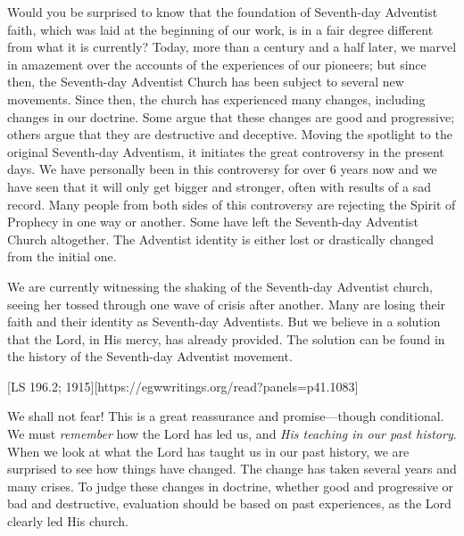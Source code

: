 Would you be surprised to know that the foundation of Seventh-day Adventist faith, which was laid at the beginning of our work, is in a fair degree different from what it is currently? Today, more than a century and a half later, we marvel in amazement over the accounts of the experiences of our pioneers; but since then, the Seventh-day Adventist Church has been subject to several new movements. Since then, the church has experienced many changes, including changes in our doctrine. Some argue that these changes are good and progressive; others argue that they are destructive and deceptive. Moving the spotlight to the original Seventh-day Adventism, it initiates the great controversy in the present days. We have personally been in this controversy for over 6 years now and we have seen that it will only get bigger and stronger, often with results of a sad record. Many people from both sides of this controversy are rejecting the Spirit of Prophecy in one way or another. Some have left the Seventh-day Adventist Church altogether. The Adventist identity is either lost or drastically changed from the initial one.

We are currently witnessing the shaking of the Seventh-day Adventist church, seeing her tossed through one wave of crisis after another. Many are losing their faith and their identity as Seventh-day Adventists. But we believe in a solution that the Lord, in His mercy, has already provided. The solution can be found in the history of the Seventh-day Adventist movement.

[LS 196.2; 1915][https://egwwritings.org/read?panels=p41.1083]

We shall not fear! This is a great reassurance and promise—though conditional. We must \textit{remember} how the Lord has led us, and \textit{His teaching in our past history}. When we look at what the Lord has taught us in our past history, we are surprised to see how things have changed. The change has taken several years and many crises. To judge these changes in doctrine, whether good and progressive or bad and destructive, evaluation should be based on past experiences, as the Lord clearly led His church.

